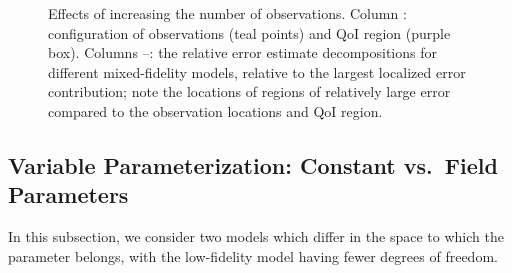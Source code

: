 \begin{figure}[htbp]
\centering
\captionsetup{justification=centering}
\captionsetup{justification=centering}
\captionsetup{justification=centering}
\captionsetup{justification=centering}
  \caption{Effects of increasing the number of observations. Column \protect{}: configuration of observations (teal points) and QoI region (purple box). Columns \protect{}--\protect{}: the relative error estimate decompositions for different mixed-fidelity models, relative to the largest localized error contribution; note the locations of regions of relatively large error compared to the observation locations and QoI region.}
  \label{fig:dataStudy}
\end{figure}

\subsection{Variable Parameterization: Constant vs.\ Field Parameters} \label{sec:constvfield}

In this subsection, we consider two models which differ in the space to which the parameter belongs, with the low-fidelity model having fewer degrees of freedom. 


